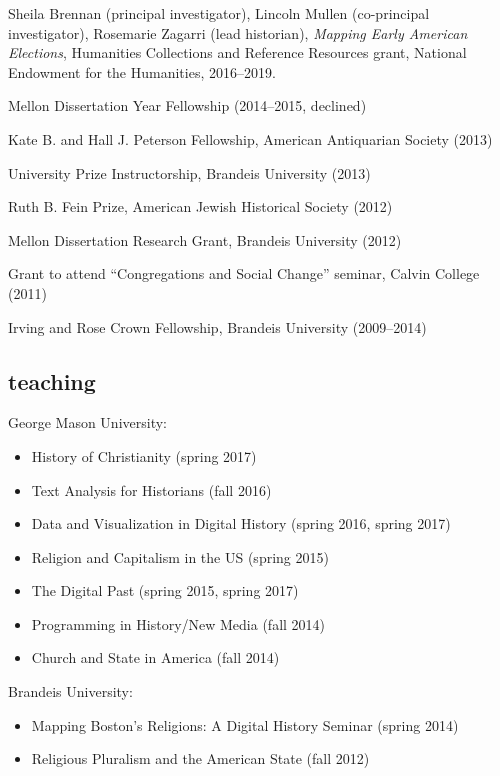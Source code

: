 \documentclass[11pt]{article}
\providecommand{\tightlist}{%
  \setlength{\itemsep}{0pt}\setlength{\parskip}{0pt}}
\begin{document}
Sheila Brennan (principal investigator), Lincoln Mullen (co-principal 
investigator), Rosemarie Zagarri (lead historian), \emph{Mapping Early 
  American Elections}, Humanities Collections and Reference Resources grant, 
National Endowment for the Humanities, 2016--2019.

Mellon Dissertation Year Fellowship (2014--2015, declined)

Kate B. and Hall J. Peterson Fellowship, American Antiquarian Society
(2013)

University Prize Instructorship, Brandeis University (2013)

Ruth B. Fein Prize, American Jewish Historical Society (2012)

Mellon Dissertation Research Grant, Brandeis University (2012)

Grant to attend ``Congregations and Social Change'' seminar, Calvin
College (2011)

Irving and Rose Crown Fellowship, Brandeis University (2009--2014)

\subsection{teaching}\label{teaching}

George Mason University:

\vspace{-0.2in}

\begin{itemize}
    \tightlist
  \item History of Christianity (spring 2017)
  \item Text Analysis for Historians (fall 2016)
  \item Data and Visualization in Digital History (spring 2016, spring 2017)
  \item Religion and Capitalism in the US (spring 2015) 
  \item The Digital Past (spring 2015, spring 2017)
  \item Programming in History/New Media (fall 2014) 
  \item Church and State in America (fall 2014)
\end{itemize}

\vspace{-0.1in}

Brandeis University:

\vspace{-0.2in}

\begin{itemize}
    \tightlist
  \item
    Mapping Boston's Religions: A Digital History Seminar (spring 2014)
  \item
    Religious Pluralism and the American State (fall 2012)
\end{itemize}
\end{document}
